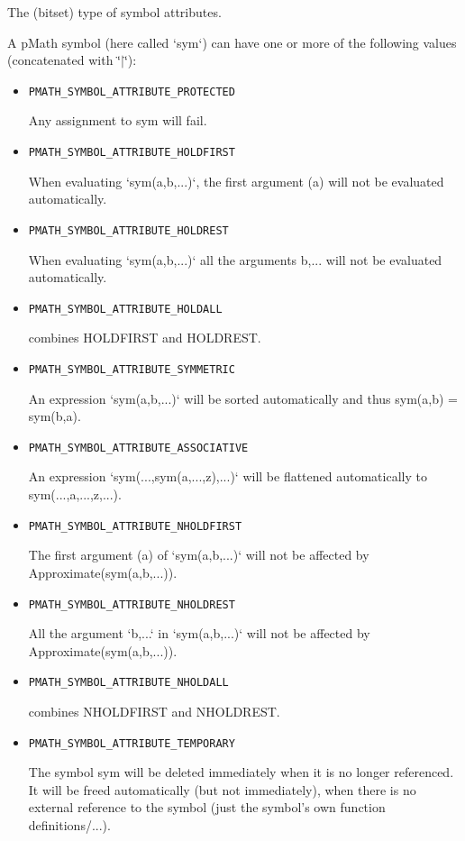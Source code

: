 The (bitset) type of symbol attributes. 

A pMath symbol (here called `sym`) can have one or more of the following values (concatenated with \char`\"{}$|$\char`\"{}): \begin{itemize}
\item {\tt PMATH\_\-SYMBOL\_\-ATTRIBUTE\_\-PROTECTED} \par
 Any assignment to sym will fail.

\item {\tt PMATH\_\-SYMBOL\_\-ATTRIBUTE\_\-HOLDFIRST} \par
 When evaluating `sym(a,b,...)`, the first argument (a) will not be evaluated automatically.

\item {\tt PMATH\_\-SYMBOL\_\-ATTRIBUTE\_\-HOLDREST} \par
 When evaluating `sym(a,b,...)` all the arguments b,... will not be evaluated automatically.

\item {\tt PMATH\_\-SYMBOL\_\-ATTRIBUTE\_\-HOLDALL} \par
 combines HOLDFIRST and HOLDREST.

\item {\tt PMATH\_\-SYMBOL\_\-ATTRIBUTE\_\-SYMMETRIC} \par
 An expression `sym(a,b,...)` will be sorted automatically and thus sym(a,b) = sym(b,a).

\item {\tt PMATH\_\-SYMBOL\_\-ATTRIBUTE\_\-ASSOCIATIVE} \par
 An expression `sym(...,sym(a,...,z),...)` will be flattened automatically to sym(...,a,...,z,...).

\item {\tt PMATH\_\-SYMBOL\_\-ATTRIBUTE\_\-NHOLDFIRST} \par
 The first argument (a) of `sym(a,b,...)` will not be affected by Approximate(sym(a,b,...)).

\item {\tt PMATH\_\-SYMBOL\_\-ATTRIBUTE\_\-NHOLDREST} \par
 All the argument `b,...` in `sym(a,b,...)` will not be affected by Approximate(sym(a,b,...)).

\item {\tt PMATH\_\-SYMBOL\_\-ATTRIBUTE\_\-NHOLDALL} \par
 combines NHOLDFIRST and NHOLDREST.

\item {\tt PMATH\_\-SYMBOL\_\-ATTRIBUTE\_\-TEMPORARY} \par
 The symbol sym will be deleted immediately when it is no longer referenced. It will be freed automatically (but not immediately), when there is no external reference to the symbol (just the symbol's own function definitions/...).


\end{itemize}
